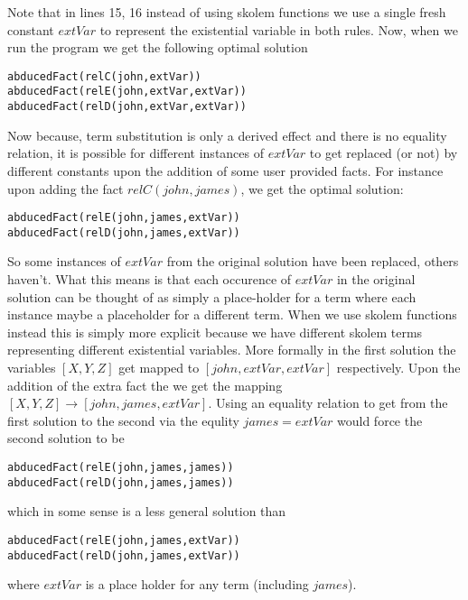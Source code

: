 \documentclass{article}
\begin{document}
Note that in lines 15, 16 instead of using skolem functions we use a single fresh constant $extVar$ to represent the existential variable in both rules. Now, when we run the program we get the following optimal solution \begin{verbatim}
abducedFact(relC(john,extVar))
abducedFact(relE(john,extVar,extVar))
abducedFact(relD(john,extVar,extVar))    
\end{verbatim}
Now because, term substitution is only a derived effect and there is no equality relation, it is possible for different instances of $extVar$ to get replaced (or not) by different constants upon the addition of some user provided facts. For instance upon adding the fact $relC(john,james)$, we get the optimal solution:
\begin{verbatim}
abducedFact(relE(john,james,extVar))
abducedFact(relD(john,james,extVar))    
\end{verbatim}
So some instances of $extVar$ from the original solution have been replaced, others haven't. What this means is that each occurence of $extVar$ in the original solution can be thought of as simply a place-holder for a term where each instance maybe a placeholder for a different term. When we use skolem functions instead this is simply more explicit because we have different skolem terms representing different existential variables. More formally in the first solution the variables $[X,Y,Z]$ get mapped to $[john, extVar,extVar]$ respectively. Upon the addition of the extra fact the we get the mapping $[X,Y,Z]\rightarrow[john,james,extVar]$. Using an equality relation to get from the first solution to the second via the equlity $james = extVar$ would force the second solution to be 
\begin{verbatim}
abducedFact(relE(john,james,james))
abducedFact(relD(john,james,james))    
\end{verbatim}
which in some sense is a less general solution than \begin{verbatim}
abducedFact(relE(john,james,extVar))
abducedFact(relD(john,james,extVar))    
\end{verbatim} where $extVar$ is a place holder for any term (including $james$).
\end{document}
